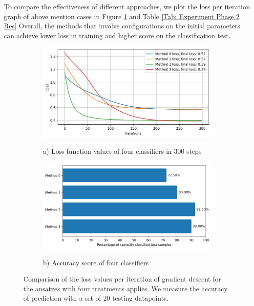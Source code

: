 To compare the effectiveness of different approaches, we plot the loss per iteration graph of above mention cases in Figure \ref{Fig: Plot Loss and Accuracy} and Table \ref{Tab: Experiment Phase 2 Res}
Overall, the methods that involve configurations on the initial parameters can achieve lower loss in training and higher score on the classification test.

\begin{figure}
    \begin{subfigure}{\textwidth}
        \includegraphics[width=\textwidth]{Artefact/Appendices/loss.png}
        \centerline{a) Loss function values of four classifiers in 300 steps}
    \end{subfigure}
    \begin{subfigure}{\textwidth}
        \includegraphics[width=\textwidth]{Artefact/Appendices/accuracy.png}
        \centerline{b) Accuracy score of four classifiers}
    \end{subfigure}

    \caption{
        Comparison of the loss values per iteration of gradient descent for the ansatzes with four treatments applies.
        We measure the accuracy of prediction with a set of 20 testing datapoints.
    }
    \label{Fig: Plot Loss and Accuracy}
\end{figure}
